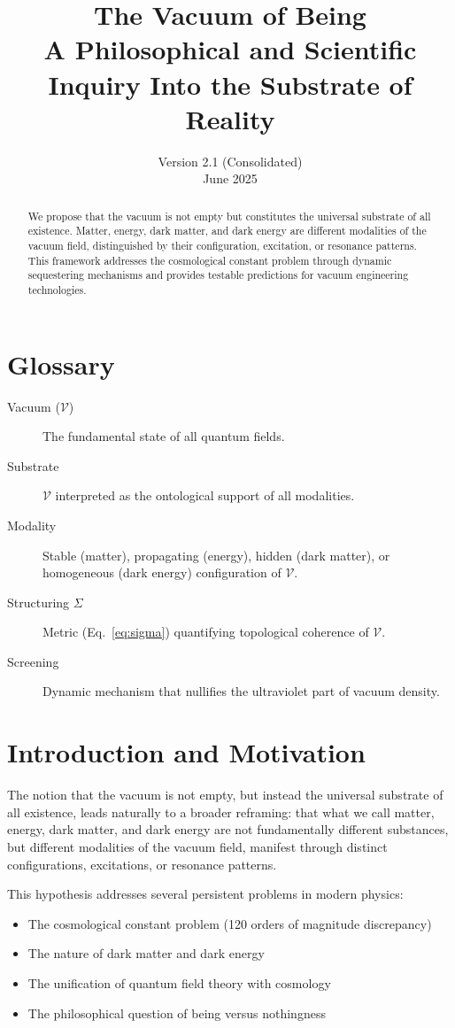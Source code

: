 \documentclass[12pt,a4paper]{article}
\title{The Vacuum of Being\\
\large A Philosophical and Scientific Inquiry Into the Substrate of Reality}
\author{Version 2.1 (Consolidated)\\
\small June 2025}
\date{}
\newcommand{\vacuum}{\mathcal{V}}
\newcommand{\structuring}{\Sigma}
\begin{document}
\maketitle
\begin{abstract}
We propose that the vacuum is not empty but constitutes the universal substrate of all existence. Matter, energy, dark matter, and dark energy are different modalities of the vacuum field, distinguished by their configuration, excitation, or resonance patterns. This framework addresses the cosmological constant problem through dynamic sequestering mechanisms and provides testable predictions for vacuum engineering technologies.
\end{abstract}

\tableofcontents
\newpage

\section*{Glossary}
\begin{description}
\item[Vacuum ($\vacuum$)] The fundamental state of all quantum fields.
\item[Substrate] $\vacuum$ interpreted as the ontological support of all modalities.
\item[Modality] Stable (matter), propagating (energy), hidden (dark matter), or homogeneous (dark energy) configuration of $\vacuum$.
\item[Structuring $\structuring$] Metric (Eq.~\ref{eq:sigma}) quantifying topological coherence of $\vacuum$.
\item[Screening] Dynamic mechanism that nullifies the ultraviolet part of vacuum density.
\end{description}

\section{Introduction and Motivation}

The notion that the vacuum is not empty, but instead the universal substrate of all existence, leads naturally to a broader reframing: that what we call matter, energy, dark matter, and dark energy are not fundamentally different substances, but different modalities of the vacuum field, manifest through distinct configurations, excitations, or resonance patterns.

This hypothesis addresses several persistent problems in modern physics:
\begin{itemize}
\item The cosmological constant problem (120 orders of magnitude discrepancy)
\item The nature of dark matter and dark energy
\item The unification of quantum field theory with cosmology
\item The philosophical question of being versus nothingness
\end{itemize}
\end{document}
